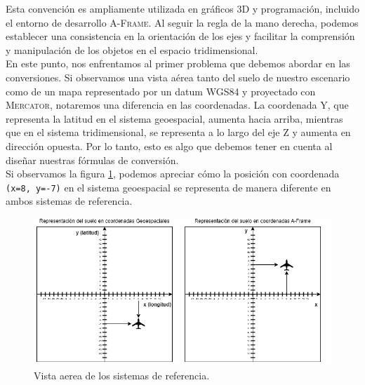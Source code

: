\documentclass[a4paper, 11pt]{book}
\begin{document}
Esta convención es ampliamente utilizada en gráficos \textsc{3D} y programación, incluido el entorno de desarrollo \textsc{A-Frame}. Al seguir la regla de la mano derecha, podemos establecer una consistencia en la orientación de los ejes y facilitar la comprensión y manipulación de los objetos en el espacio tridimensional.\\
En este punto, nos enfrentamos al primer problema que debemos abordar en las conversiones. Si observamos una vista aérea tanto del suelo de nuestro escenario como de un mapa representado por un datum \textsc{WGS84} y proyectado con \textsc{Mercator}, notaremos una diferencia en las coordenadas.
La coordenada \textsc{Y}, que representa la latitud en el sistema geoespacial, aumenta hacia arriba, mientras que en el sistema tridimensional, se representa a lo largo del eje \textsc{Z} y aumenta en dirección opuesta. Por lo tanto, esto es algo que debemos tener en cuenta al diseñar nuestras fórmulas de conversión.\\
Si observamos la figura \ref{fig:sistemasDeReferencia}, podemos apreciar cómo la posición con coordenada \texttt{(x=8, y=-7)} en el sistema geoespacial se representa de manera diferente en ambos sistemas de referencia.
\begin{figure}[H]
  \centering
  \includegraphics[width=13cm, keepaspectratio]{img/sistemasDeReferencia.drawio.png}
  \caption{Vista aerea de los sistemas de referencia.}
  \label{fig:sistemasDeReferencia}
\end{figure}
\end{document}
